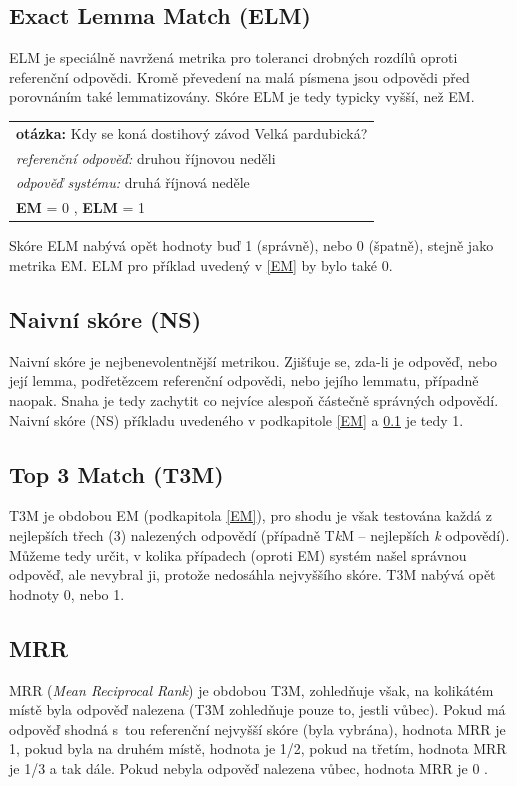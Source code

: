 \subsection{Exact Lemma Match (ELM)}
\label{ELM}
ELM je speciálně navržená metrika pro toleranci drobných rozdílů oproti referenční odpovědi. Kromě převedení na malá písmena jsou odpovědi před porovnáním také lemmatizovány. Skóre ELM je tedy typicky vyšší, než EM.
\begin{center}
\begin{tabular}{l}
    \textbf{otázka:} Kdy se koná dostihový závod Velká pardubická?\\
    \emph{referenční odpověď:} druhou říjnovou neděli\\
    \emph{odpověď systému:} druhá říjnová neděle \\
    \textbf{EM} = 0 , \textbf{ELM} = 1\\
\end{tabular}
\end{center}

Skóre ELM nabývá opět hodnoty buď 1 (správně), nebo 0 (špatně), stejně jako metrika EM. ELM pro příklad uvedený v \ref{EM} by bylo také 0.

\subsection{Naivní skóre (NS)}
Naivní skóre je nejbenevolentnější metrikou. Zjišťuje se, zda-li je odpověď, nebo její lemma, podřetězcem referenční odpovědi, nebo jejího lemmatu, případně naopak. Snaha je tedy zachytit co nejvíce alespoň částečně správných odpovědí. Naivní skóre (NS) příkladu uvedeného v podkapitole \ref{EM} a \ref{ELM} je tedy 1. 

\subsection{Top 3 Match (T3M)}
T3M je obdobou EM (podkapitola \ref{EM}), pro shodu je však testována každá z nejlepších třech (3) nalezených odpovědí (případně T\textit{k}M -- nejlepších \textit{k} odpovědí). Můžeme tedy určit, v kolika případech (oproti EM) systém našel správnou odpověď, ale nevybral ji, protože nedosáhla nejvyššího skóre. T3M nabývá opět hodnoty 0, nebo 1.

\subsection{MRR}
MRR (\emph{Mean Reciprocal Rank}) je obdobou T3M, zohledňuje však, na kolikátém místě byla odpověď nalezena (T3M zohledňuje pouze to, jestli vůbec). Pokud má odpověď shodná s~tou referenční nejvyšší skóre (byla vybrána), hodnota MRR je 1, pokud byla na druhém místě, hodnota je 1/2, pokud na třetím, hodnota MRR je 1/3 a tak dále. Pokud nebyla odpověď nalezena vůbec, hodnota MRR je 0 \cite{MRR}.

